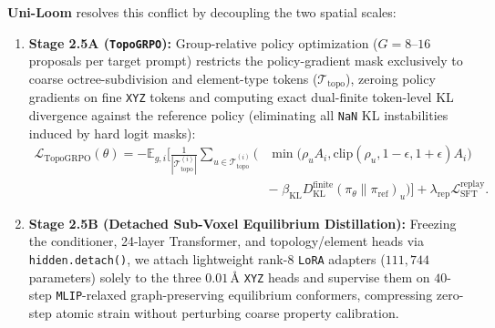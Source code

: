 \documentclass[11pt,a4paper]{article}
\begin{document}
\textbf{Uni-Loom} resolves this conflict by decoupling the two spatial scales:
\begin{enumerate}[leftmargin=1.6em,itemsep=2pt,topsep=2pt]
    \item \textbf{Stage 2.5A (\texttt{TopoGRPO}):} Group-relative policy optimization \citep{shao2024grpo} ($G = 8\text{--}16$ proposals per target prompt) restricts the policy-gradient mask exclusively to coarse octree-subdivision and element-type tokens ($\mathcal{T}_{\text{topo}}$), zeroing policy gradients on fine \texttt{XYZ} tokens and computing exact dual-finite token-level KL divergence against the reference policy (eliminating all \texttt{NaN} KL instabilities induced by hard logit masks):
    \begin{equation}
    \label{eq:topogrpo}
    \begin{aligned}
    \mathcal{L}_{\text{TopoGRPO}}(\theta) = -\mathbb{E}_{g, i}\!\Bigg[\frac{1}{|\mathcal{T}_{\text{topo}}^{(i)}|} \sum_{u \in \mathcal{T}_{\text{topo}}^{(i)}} \Big( &\min\!\big(\rho_u A_i, \text{clip}(\rho_u, 1-\epsilon, 1+\epsilon)A_i\big) \\
    &-\; \beta_{\text{KL}} D_{\text{KL}}^{\text{finite}}(\pi_\theta \| \pi_{\text{ref}})_u \Big)\Bigg] + \lambda_{\text{rep}} \mathcal{L}_{\text{SFT}}^{\text{replay}}.
    \end{aligned}
    \end{equation}
    \item \textbf{Stage 2.5B (Detached Sub-Voxel Equilibrium Distillation):} Freezing the conditioner, 24-layer Transformer, and topology/element heads via \texttt{hidden.detach()}, we attach lightweight rank-$8$ \texttt{LoRA} adapters ($111{,}744$ parameters) solely to the three $0.01\,\text{\AA}$ \texttt{XYZ} heads and supervise them on $40$-step \texttt{MLIP}-relaxed graph-preserving equilibrium conformers, compressing zero-step atomic strain without perturbing coarse property calibration.
\end{enumerate}
\end{document}
